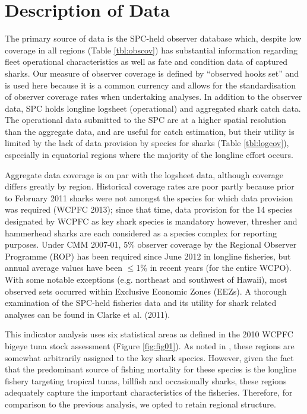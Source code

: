 \documentclass[12pt]{SCreport}
\begin{document}
\section{Description of Data}

The primary source of data is the SPC-held observer database which, despite low coverage in all regions (Table \ref{tbl:obscov}) has substantial information regarding fleet operational characteristics as well as fate and condition data of captured sharks. Our measure of observer coverage is defined by “observed hooks set” and is used here because it is a common currency and allows for the standardisation of observer coverage rates when undertaking analyses. In addition to the observer data, SPC holds longline logsheet (operational) and aggregated shark catch data. The operational data submitted to the SPC are at a higher spatial resolution than the aggregate data, and are useful for catch estimation, but their utility is limited by the lack of data provision by species for sharks (Table \ref{tbl:logcov}), especially in equatorial regions where the majority of the longline effort occurs. 


Aggregate data coverage is on par with the logsheet data, although coverage differs greatly by region. Historical coverage rates are poor partly because prior to February 2011 sharks were not amongst the species for which data provision was required (WCPFC 2013); since that time, data provision for the 14 species designated by WCPFC as key shark species is mandatory however, thresher and hammerhead sharks are each considered as a species complex for reporting purposes. Under CMM 2007-01, 5\% observer coverage by the Regional Observer Programme (ROP) has been required since June 2012 in longline fisheries, but annual average values have been $\leq$1\% in recent years (for the entire WCPO). With some notable exceptions (e.g. northeast and southwest of Hawaii), most observed sets occurred within Exclusive Economic Zones (EEZs). A thorough examination of the SPC-held fisheries data and its utility for shark related analyses can be found in Clarke et al. (2011).


This indicator analysis uses six statistical areas as defined in the 2010 WCPFC bigeye tuna stock assessment (Figure \ref{fig:fig01}). As noted in \citet{Clarke2011_a}, these regions are somewhat arbitrarily assigned to the key shark species. However, given the fact that the predominant source of fishing mortality for these species is the longline fishery targeting tropical tunas, billfish and occasionally sharks, these regions adequately capture the important characteristics of the fisheries. Therefore, for comparison to the previous analysis, we opted to retain regional structure.
\end{document}
